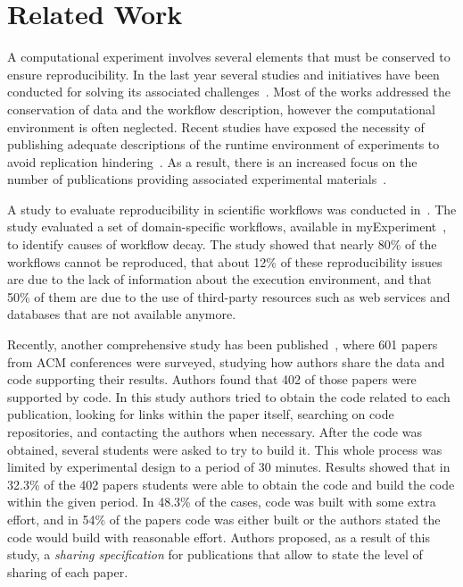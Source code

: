 \section{Related Work}
\label{sec:related-work}

A computational experiment involves several elements that must be conserved 
to ensure reproducibility. In the last year several studies and initiatives have been 
conducted for solving its associated challenges~\cite{Hothorn01052011,Sylwester14}. 
Most of the works addressed the conservation of data and the workflow description, 
however the computational environment is often neglected. Recent studies have 
exposed the necessity of publishing adequate descriptions of the runtime environment of experiments to avoid replication hindering~\cite{Rollins201459}. As a result, there is an increased focus on the number of publications 
providing associated experimental materials~\cite{Brown2012, diginorm}.

A study to evaluate reproducibility in scientific workflows was conducted in~\cite{zhao2012}. The study evaluated a set of domain-specific workflows, available in  myExperiment~\cite{myExperiment}, to identify causes of workflow decay. The study showed that nearly 80\% of the workflows cannot be reproduced, that about 12\% of these reproducibility issues are due to the lack of information about the execution environment, and that 50\% of them are due to the use of third-party resources such as web services and databases that are not available anymore. 


Recently, another comprehensive study has been published~\cite{Collberg2015}, where 601 papers from ACM conferences were surveyed, studying how authors share the data and code supporting their results. Authors found that 402 of those papers were supported by code. In this study authors tried to obtain the code related to each publication, looking for links within the paper itself, searching on code repositories, and contacting the authors when necessary. After the code was obtained, several students were asked to try to build it. This whole process was limited by experimental design to a period of 30 minutes. Results showed that in 32.3\% of the 402 papers students were able to obtain the code and build the code within the given period. In 48.3\% of the cases, code was built with some extra effort, and in 54\% of the papers code was either built or the authors stated the code would build with reasonable effort. Authors proposed, as a result of this study, a {\it sharing specification} for publications that allow to state the level of sharing of each paper.

